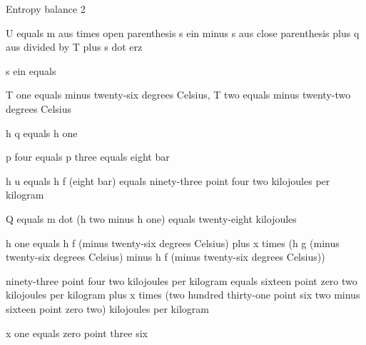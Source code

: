 Entropy balance 2

U equals m aus times open parenthesis s ein minus s aus close parenthesis plus q aus divided by T plus s dot erz

s ein equals

T one equals minus twenty-six degrees Celsius, T two equals minus twenty-two degrees Celsius

h q equals h one

p four equals p three equals eight bar

h u equals h f (eight bar) equals ninety-three point four two kilojoules per kilogram

Q equals m dot (h two minus h one) equals twenty-eight kilojoules

h one equals h f (minus twenty-six degrees Celsius) plus x times (h g (minus twenty-six degrees Celsius) minus h f (minus twenty-six degrees Celsius))

ninety-three point four two kilojoules per kilogram equals sixteen point zero two kilojoules per kilogram plus x times (two hundred thirty-one point six two minus sixteen point zero two) kilojoules per kilogram

x one equals zero point three six